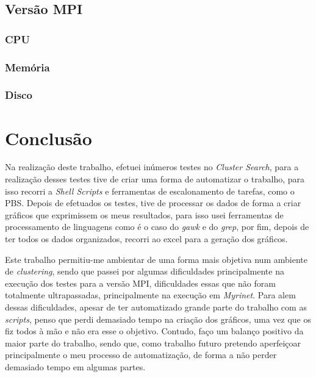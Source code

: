 \documentclass[conference,compsoc]{IEEEtran}
\begin{document}
\subsection{Versão MPI}
\subsubsection{CPU}
\subsubsection{Memória}
\subsubsection{Disco}

\section{Conclusão}
Na realização deste trabalho, efetuei inúmeros testes no \textit{Cluster Search}, para a realização desses testes tive de criar uma forma de automatizar o trabalho, para isso recorri a \textit{Shell Scripts} e ferramentas de escalonamento de tarefas, como o PBS. Depois de efetuados os testes, tive de processar os dados de forma a criar gráficos que exprimissem os meus resultados, para isso usei ferramentas de processamento de linguagens como é o caso do \textit{gawk} e do \textit{grep}, por fim, depois de ter todos os dados organizados, recorri ao excel para a geração dos gráficos. 

Este trabalho permitiu-me ambientar de uma forma mais objetiva num ambiente de \textit{clustering}, sendo que passei por algumas dificuldades principalmente na execução dos testes para a versão MPI, dificuldades essas que não foram totalmente ultrapassadas, principalmente na execução em \textit{Myrinet}. Para alem dessas dificuldades, apesar de ter automatizado grande parte do trabalho com as \textit{scripts}, penso que perdi demasiado tempo na criação dos gráficos, uma vez que os fiz todos à mão e não era esse o objetivo. Contudo, faço um balanço positivo da maior parte do trabalho, sendo que, como trabalho futuro pretendo aperfeiçoar principalmente o meu processo de automatização, de forma a não perder demasiado tempo em algumas partes. 
\end{document}
